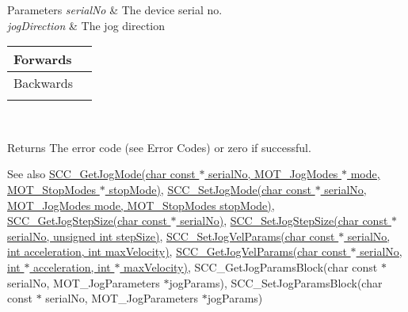 \begin{DoxyParams}{Parameters}
{\em serial\+No} & The device serial no. \\
\hline
{\em jog\+Direction} & The jog direction \begin{tabularx}{\linewidth}{|*{2}{>{\raggedright\arraybackslash}X|}}\hline
Forwards&1 \\\cline{1-2}
Backwards&2 \\\cline{1-2}
\end{tabularx}
\\
\hline
\end{DoxyParams}
\begin{DoxyReturn}{Returns}
The error code (see Error Codes) or zero if successful. 
\end{DoxyReturn}
\begin{DoxySeeAlso}{See also}
\hyperlink{group___t_cube_stepper_ga2a46e3c180400d1387cb057cdf94c6c4}{S\+C\+C\+\_\+\+Get\+Jog\+Mode(char const $\ast$ serial\+No, M\+O\+T\+\_\+\+Jog\+Modes $\ast$ mode, M\+O\+T\+\_\+\+Stop\+Modes $\ast$ stop\+Mode)}, \hyperlink{group___t_cube_stepper_gae802a1cc2dbbc7c195707e7dc8edd7bc}{S\+C\+C\+\_\+\+Set\+Jog\+Mode(char const $\ast$ serial\+No, M\+O\+T\+\_\+\+Jog\+Modes mode, M\+O\+T\+\_\+\+Stop\+Modes stop\+Mode)}, \hyperlink{group___t_cube_stepper_gafddac4a09a4df4ec56756592559c2940}{S\+C\+C\+\_\+\+Get\+Jog\+Step\+Size(char const $\ast$ serial\+No)}, \hyperlink{group___t_cube_stepper_ga7ac0f4bd9b83c05a0ec6b7cf33b00ae2}{S\+C\+C\+\_\+\+Set\+Jog\+Step\+Size(char const $\ast$ serial\+No, unsigned int step\+Size)}, \hyperlink{group___t_cube_stepper_gabf0a72b1c8e1751bffeac150bfa2596a}{S\+C\+C\+\_\+\+Set\+Jog\+Vel\+Params(char const $\ast$ serial\+No, int acceleration, int max\+Velocity)}, \hyperlink{group___t_cube_stepper_gabdc0d8df25714517d6905c53a106f021}{S\+C\+C\+\_\+\+Get\+Jog\+Vel\+Params(char const $\ast$ serial\+No, int $\ast$ acceleration, int $\ast$ max\+Velocity)}, S\+C\+C\+\_\+\+Get\+Jog\+Params\+Block(char const $\ast$ serial\+No, M\+O\+T\+\_\+\+Jog\+Parameters $\ast$jog\+Params), S\+C\+C\+\_\+\+Set\+Jog\+Params\+Block(char const $\ast$ serial\+No, M\+O\+T\+\_\+\+Jog\+Parameters $\ast$jog\+Params)


\end{DoxySeeAlso}

\begin{DoxyCodeInclude}
\end{DoxyCodeInclude}

